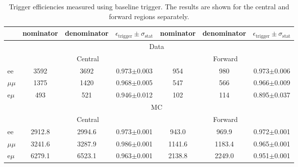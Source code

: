 
\begin{table}[hbp] \caption{Trigger efficiencies measured using \HT baseline trigger. The results are shown for the central and forward regions separately.} 
\centering 
\renewcommand{\arraystretch}{1.2} 
\begin{tabular}{l|c|c|c|c|c|c}     

 & nominator & denominator & $\epsilon_{\text{trigger}} \pm \sigma_{\text{stat}}$ &  nominator & denominator & $\epsilon_{\text{trigger}} \pm \sigma_{\text{stat}}$  \\ 
\hline

&\multicolumn{6}{c}{Data} \\
\hline
&  \multicolumn{3}{c|}{Central } & \multicolumn{3}{c}{ Forward }\\
\hline
ee & 3592 & 3692 & 0.973$\pm$0.003 & 954 & 980 & 0.973$\pm$0.006 \\
$\mu\mu$ & 1375 & 1420 & 0.968$\pm$0.005 & 547 & 566 & 0.966$\pm$0.009 \\
e$\mu$ & 493 & 521 & 0.946$\pm$0.012 & 102 & 114 & 0.895$\pm$0.037 \\
 
 
\hline

& \multicolumn{6}{c}{MC} \\
\hline
&  \multicolumn{3}{c|}{Central } & \multicolumn{3}{c}{ Forward } \\
\hline 
ee & 2912.8 & 2994.6 & 0.973$\pm$0.001 & 943.0 & 969.9 & 0.972$\pm$0.001 \\
$\mu\mu$ & 3241.6 & 3287.9 & 0.986$\pm$0.001 & 1141.6 & 1183.4 & 0.965$\pm$0.001 \\
e$\mu$ & 6279.1 & 6523.1 & 0.963$\pm$0.001 & 2138.8 & 2249.0 & 0.951$\pm$0.001 \\
    
    \hline 
\end{tabular}  
\label{tab:EffValues_Seperated}
\end{table}	
